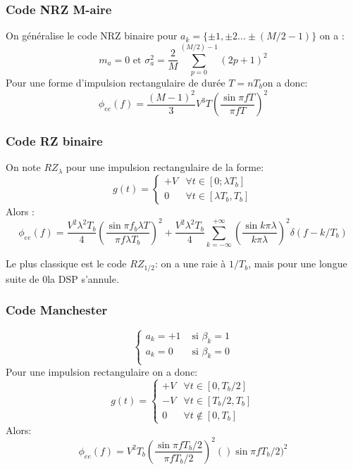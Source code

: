 \documentclass[main.tex]{subfiles}
\begin{document}
\subsubsection{Code NRZ M-aire}
\begin{defin}
  On généralise le code NRZ binaire pour $a_k=\{\pm 1,\pm2 ... \pm
  (M/2-1)\}$ on a :
  \[  m_a = 0 \text{ et } \sigma_a^2 = \frac{2}{M} \sum_{p=0}^{(M/2)-1}(2p+1)^2
  \]
Pour une forme d'impulsion rectangulaire de durée $T=nT_b$on a donc:
  \[
    \phi_{ee}(f)= \frac{(M-1)^2}{3}V^3T \left(\frac{\sin\pi fT}{\pi f T}\right)^2
  \]
  
\end{defin}
\subsubsection{Code RZ binaire}

\begin{defin}
  On note $RZ_\lambda$ pour une impulsion rectangulaire de la forme:
  \[g(t)= 
    \begin{cases}
      +V & \forall t \in [0;\lambda T_b] \\
      0 & \forall t \in [\lambda T_b,T_b]
    \end{cases}
  \]
  Alors :
  \[
    \phi_{ee}(f)= \frac{V^2\lambda^2T_b}{4}\left(\frac{\sin\pi f_b\lambda T}{\pi f\lambda T_b}
    \right)^2 + \frac{V^2\lambda^2T_b}{4}\sum_{k=-\infty}^{+\infty} \left(\frac{\sin k\pi\lambda}{k\pi\lambda}\right)^2\delta(f-k/T_b)
  \]
\end{defin}
\begin{rem}
  Le plus classique est le code $RZ_{1/2}$:  on a une raie à $1/T_b$,
  mais pour une longue suite de $0$la DSP s'annule.
\end{rem}
\subsubsection{Code Manchester}
\begin{defin}
  \[
    \begin{cases}
      a_k = + 1 & \text{ si } \beta_k =1 \\
      a_k = 0 & \text{ si } \beta_k =0 \\
    \end{cases}
  \]
  Pour une impulsion rectangulaire on a donc:
  \[
      g(t)=
      \begin{cases}
        + V & \forall t \in [0,T_b/2] \\
        -V  & \forall t \in [T_b/2,T_b]\\
        0 & \forall t \notin [0,T_b]
      \end{cases}
    \]
    Alors:
    \[
 \phi_{ee}(f)= V^2T_b \left(\frac{\sin\pi fT_b/2}{\pi f T_b/2}\right)^2()\sin\pi fT_b/2)^2
    \]
\end{defin}
\end{document}
